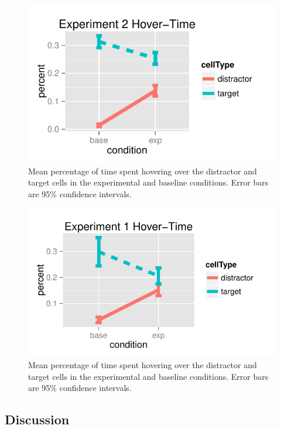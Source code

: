 \documentclass[10pt,letterpaper]{article}
\begin{document}
\begin{figure}[b!]
\begin{center}
\includegraphics[scale=.75]{images/exp2MouseTracking.pdf}
\caption{Mean percentage of time spent hovering over the distractor and target cells in the experimental and baseline conditions. Error bars are 95\% confidence intervals.}
\label{fig:exp2hover}
\end{center}
\end{figure}

\begin{figure}[b!]
\begin{center}
\includegraphics[scale=.75]{images/exp1MouseTracking.pdf}
\caption{Mean percentage of time spent hovering over the distractor and target cells in the experimental and baseline conditions. Error bars are 95\% confidence intervals.}
\label{fig:exp1hover}
\end{center}
\end{figure}
\subsection{Discussion}
\end{document}
